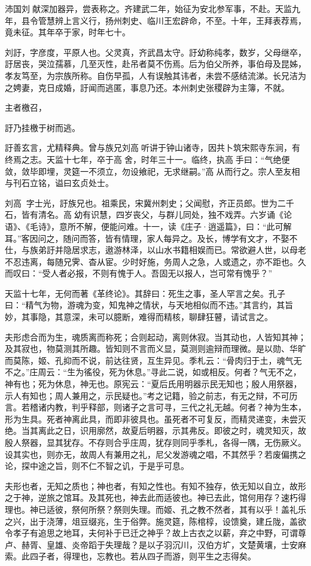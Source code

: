 \documentclass[12pt,UTF8]{ctexbook}
\begin{document}
沛国刘献深加器异，尝表称之。齐建武二年，始征为安北参军事，不赴。天监九年，县令管慧辨上言义行，扬州刺史、临川王宏辟命，不至。十年，王拜表荐焉，竟未征。其年卒于家，时年七十。

刘訏，字彦度，平原人也。父灵真，齐武昌太守。訏幼称纯孝，数岁，父母继卒，訏居丧，哭泣孺慕，几至灭性，赴吊者莫不伤焉。后为伯父所养，事伯母及昆姊，孝友笃至，为宗族所称。自伤早孤，人有误触其讳者，未尝不感结流涕。长兄洁为之娉妻，克日成婚，訏闻而逃匿，事息乃还。本州刺史张稷辟为主簿，不就。

主者檄召，

訏乃挂檄于树而逃。

訏善玄言，尤精释典。曾与族兄刘高听讲于钟山诸寺，因共卜筑宋熙寺东涧，有终焉之志。天监十七年，卒于高舍，时年三十一。临终，执高手曰：“气绝便敛，敛毕即埋，灵筵一不须立，勿设飨祀，无求继嗣。”高从而行之。宗人至友相与刊石立铭，谥曰玄贞处士。

刘高，字士光，訏族兄也。祖乘民，宋冀州刺史；父闻慰，齐正员郎。世为二千石，皆有清名。高幼有识慧，四岁丧父，与群儿同处，独不戏弄。六岁诵《论语》、《毛诗》，意所不解，便能问难。十一，读《庄子·逍遥篇》，曰：“此可解耳。”客因问之，随问而答，皆有情理，家人每异之。及长，博学有文才，不娶不仕，与族弟訏并隐居求志，遨游林泽，以山水书籍相娱而已。常欲避人世，以母老不忍违离，每随兄霁、杳从宦。少时好施，务周人之急，人或遗之，亦不距也。久而叹曰：“受人者必报，不则有愧于人。吾固无以报人，岂可常有愧乎？”

天监十七年，无何而著《革终论》。其辞曰：死生之事，圣人罕言之矣。孔子曰：“精气为物，游魂为变，知鬼神之情状，与天地相似而不违。”其言约，其旨妙，其事隐，其意深，未可以臆断，难得而精核，聊肆狂瞽，请试言之。

夫形虑合而为生，魂质离而称死；合则起动，离则休寂。当其动也，人皆知其神；及其寂也，物莫测其所趣。皆知则不言而义显，莫测则逾辩而理微。是以勋、华旷而莫陈，姬、孔抑而不说，前达往贤，互生异见。季札云：“骨肉归于土，魂气无不之。”庄周云：“生为徭役，死为休息。”寻此二说，如或相反。何者？气无不之，神有也；死为休息，神无也。原宪云：“夏后氏用明器示民无知也；殷人用祭器，示人有知也；周人兼用之，示民疑也。”考之记籍，验之前志，有无之辩，不可历言。若稽诸内教，判乎释部，则诸子之言可寻，三代之礼无越。何者？神为生本，形为生具。死者神离此具，而即非彼具也。虽死者不可复反，而精灵递变，未尝灭绝。当其离此之日，识用廓然，故夏后明器，示其弗反。即彼之时，魂灵知灭，故殷人祭器，显其犹存。不存则合乎庄周，犹存则同乎季札，各得一隅，无伤厥义。设其实也，则亦无，故周人有兼用之礼，尼父发游魂之唱，不其然乎？若废偏携之论，探中途之旨，则不仁不智之讥，于是乎可息。

夫形也者，无知之质也；神也者，有知之性也。有知不独存，依无知以自立，故形之于神，逆旅之馆耳。及其死也，神去此而适彼也。神已去此，馆何用存？速朽得理也。神已适彼，祭何所祭？祭则失理。而姬、孔之教不然者，其有以乎！盖礼乐之兴，出于浇薄，俎豆缀兆，生于俗弊。施灵筵，陈棺椁，设馈奠，建丘陇，盖欲令孝子有追思之地耳，夫何补于已迁之神乎？故上古衣之以薪，弃之中野，可谓尊卢、赫胥、皇雄、炎帝蹈于失理哉？是以子羽沉川，汉伯方圹，文楚黄壤，士安麻索。此四子者，得理也，忘教也。若从四子而游，则平生之志得矣。
\end{document}
